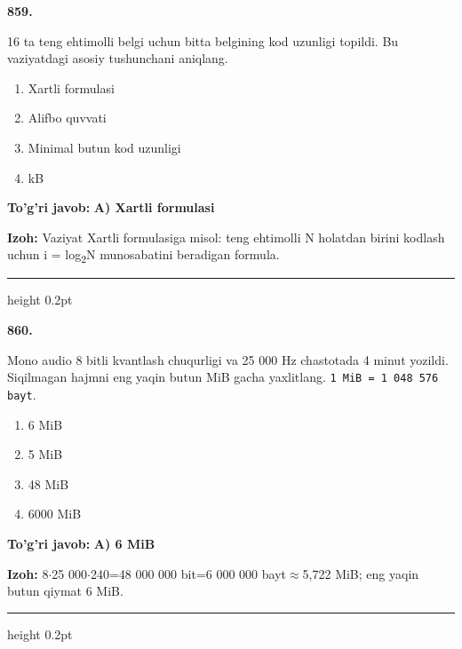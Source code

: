 \documentclass[10pt,a4paper,oneside]{article}
\begin{document}
\noindent\textbf{\color{ink}859.}
\par
16 ta teng ehtimolli belgi uchun bitta belgining kod uzunligi topildi. Bu vaziyatdagi asosiy tushunchani aniqlang.
\begin{enumerate}[label=\Alph*),leftmargin=9mm]
\item Xartli formulasi
\item Alifbo quvvati
\item Minimal butun kod uzunligi
\item kB
\end{enumerate}
\begin{tcolorbox}[enhanced,breakable,colback=teal!4,colframe=teal!50!black,boxrule=0.5pt,arc=1.1mm,left=3mm,right=3mm,top=1.7mm,bottom=1.7mm,before skip=2mm,after skip=2mm]
\textbf{\color{teal}To'g'ri javob:} \textbf{A) Xartli formulasi}
\par\smallskip
\textbf{Izoh:} Vaziyat Xartli formulasiga misol: teng ehtimolli N holatdan birini kodlash uchun i = log\textsubscript{2}N munosabatini beradigan formula.
\end{tcolorbox}
\vspace{2mm}\hrule height 0.2pt \vspace{3mm}

\noindent\textbf{\color{ink}860.}
\par
Mono audio 8 bitli kvantlash chuqurligi va 25 000 Hz chastotada 4 minut yozildi. Siqilmagan hajmni eng yaqin butun MiB gacha yaxlitlang. \texttt{1 MiB = 1 048 576 bayt}.
\begin{enumerate}[label=\Alph*),leftmargin=9mm]
\item 6 MiB
\item 5 MiB
\item 48 MiB
\item 6000 MiB
\end{enumerate}
\begin{tcolorbox}[enhanced,breakable,colback=teal!4,colframe=teal!50!black,boxrule=0.5pt,arc=1.1mm,left=3mm,right=3mm,top=1.7mm,bottom=1.7mm,before skip=2mm,after skip=2mm]
\textbf{\color{teal}To'g'ri javob:} \textbf{A) 6 MiB}
\par\smallskip
\textbf{Izoh:} 8\ensuremath{\cdot}25 000\ensuremath{\cdot}240=48 000 000 bit=6 000 000 bayt\ensuremath{\approx}5,722 MiB; eng yaqin butun qiymat 6 MiB.
\end{tcolorbox}
\vspace{2mm}\hrule height 0.2pt \vspace{3mm}
\end{document}

